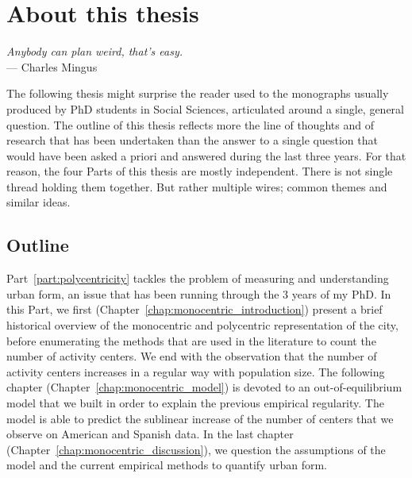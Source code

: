 

\chapter{About this thesis}
\label{chap:methodology}


\begin{flushright}{\slshape    
Anybody can plan weird, that's easy.} \\ \medskip
--- Charles Mingus
\end{flushright}


\bigskip 


The following thesis might surprise the reader used to the monographs usually
produced by PhD students in Social Sciences, articulated around a single,
general question. The outline of this thesis reflects more the
line of thoughts and of research that has been undertaken than the answer to a
single question that would have been asked a priori and answered during the
last three years. For that reason, the four Parts of this thesis are mostly
independent. There is not single thread holding them together. But rather multiple
wires; common themes and similar ideas. 

\section{Outline}

Part~\ref{part:polycentricity} tackles the problem of measuring and
understanding urban form, an issue that has been running through the $3$ years
of my PhD. In this Part, we first (Chapter~\ref{chap:monocentric_introduction})
present a brief historical overview of the monocentric and polycentric
representation of the city, before enumerating the methods that are used in the
literature to count the number of activity centers. We end with the observation
that the number of activity centers increases in a regular way with population
size. The following chapter (Chapter~\ref{chap:monocentric_model}) is devoted to
an out-of-equilibrium model that we built in order to explain the previous
empirical regularity. The model is able to predict the sublinear increase of the
number of centers that we observe on American and Spanish data. In the last
chapter (Chapter~\ref{chap:monocentric_discussion}), we question the assumptions
of the model and the current empirical methods to quantify urban form.\\

